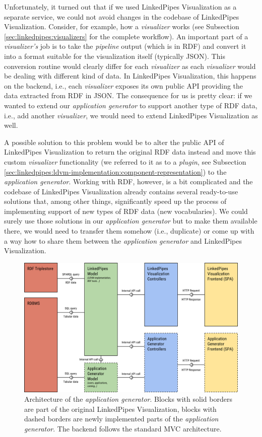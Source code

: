 Unfortunately, it turned out that if we used LinkedPipes Visualization as a separate service, we could not avoid changes in the codebase of LinkedPipes Visualization. Consider, for example, how a \emph{visualizer} works (see Subsection \ref{sec:linkedpipes:visualizers} for the complete workflow). An important part of a \emph{visualizer's} job is to take the \emph{pipeline} output (which is in RDF) and convert it into a format suitable for the visualization itself (typically JSON). This conversion routine would clearly differ for each \emph{visualizer} as each \emph{visualizer} would be dealing with different kind of data. In LinkedPipes Visualization, this happens on the backend, i.e., each \emph{visualizer} exposes its own public API providing the data extracted from RDF in JSON. The consequence for us is pretty clear: if we wanted to extend our \emph{application generator} to support another type of RDF data, i.e., add another \emph{visualizer}, we would need to extend LinkedPipes Visualization as well. 

A possible solution to this problem would be to alter the public API of LinkedPipes Visualization to return the original RDF data instead and move this custom \emph{visualizer} functionality (we referred to it as to a \emph{plugin}, see Subsection \ref{sec:linkedpipes:ldvm-implementation:component-representation}) to the \emph{application generator}. Working with RDF, however, is a bit complicated and the codebase of LinkedPipes Visualization already contains several ready-to-use solutions that, among other things, significantly speed up the process of implementing support of new types of RDF data (new vocabularies). We could surely use those solutions in our \emph{application generator} but to make them available there, we would need to transfer them somehow (i.e., duplicate) or come up with a way how to share them between the \emph{application generator} and LinkedPipes Visualization.

\begin{figure}
	\centering
	\includegraphics[width=140mm]{img/04_application_generator_architecture.png}
	\caption{Architecture of the \emph{application generator}. Blocks with solid borders are part of the original LinkedPipes Visualization, blocks with dashed borders are newly implemented parts of the \emph{application generator}. The backend follows the standard MVC architecture.} 
	\label{fig:proposed-application-generator-architecture}
\end{figure}

